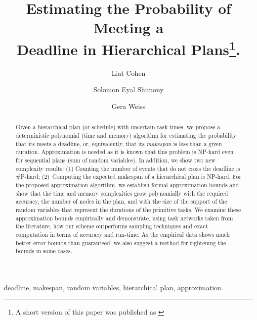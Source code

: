 \documentclass[review]{elsarticle}
\begin{document}
\begin{frontmatter}

\title{Estimating the Probability of Meeting a \\ Deadline in Hierarchical Plans\footnote{A short version of this paper was published as \cite{cohen2015estimating}}.}

\author{Liat Cohen}
\author{Solomon Eyal Shimony}
\author{Gera Weiss}
\address{Computer Science Department\\
Ben Gurion University of The Negev\\
Beer-Sheva, Israel 84105\\}

\begin{abstract}
		Given a hierarchical plan (or schedule) with uncertain task times, we propose a deterministic polynomial (time and memory) algorithm for estimating the probability that its meets a deadline, or, equivalently, that its {\em makespan} is less than a given duration. Approximation is needed as it is known that this problem is NP-hard even for sequential plans (sum of random variables). In addition, we show two new complexity results: (1) Counting the number of events that do not cross the deadline is \#P-hard; (2)~Computing the expected makespan of a hierarchical plan is NP-hard. For the proposed approximation algorithm, we establish formal approximation bounds and show that the time and memory complexities grow polynomially with the required accuracy, the number of nodes in the plan, and with the size of the support of the random variables that represent the durations of the primitive tasks. We examine these approximation bounds empirically and demonstrate, using task networks taken from the literature, how our scheme outperforms sampling techniques and exact computation in terms of accuracy and run-time. As the empirical data shows much better error bounds than guaranteed, we also suggest a method for tightening the bounds in some cases. 
\end{abstract}  

\begin{keyword}
deadline, makespan, random variables, hierarchical plan, approximation.

\end{keyword}

\end{frontmatter}

\linenumbers


\end{document}
